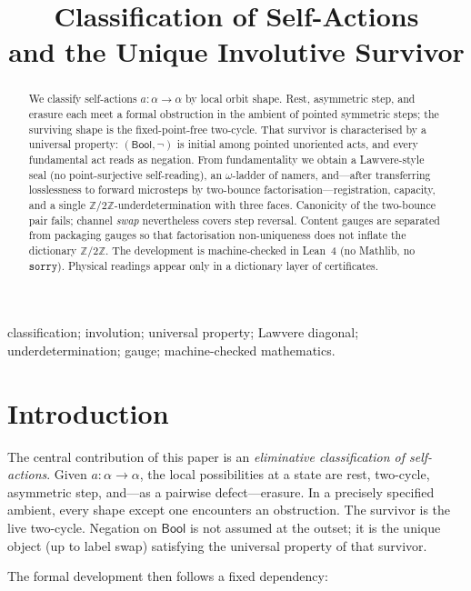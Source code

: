 \documentclass[11pt,a4paper]{article}
\title{Classification of Self-Actions\\[0.25em]
  and the Unique Involutive Survivor}
\author{} %
\date{}
\theoremstyle{plain}
\theoremstyle{definition}
\theoremstyle{remark}
\newcommand{\Bool}{\mathsf{Bool}}
\newcommand{\Ztwo}{\mathbb{Z}/2\mathbb{Z}}
\begin{document}
\maketitle

\begin{abstract}
We classify self-actions $a:\alpha\to\alpha$ by local orbit shape. Rest,
asymmetric step, and erasure each meet a formal obstruction in the ambient
of pointed symmetric steps; the surviving shape is the fixed-point-free
two-cycle. That survivor is characterised by a universal property:
$(\Bool,\neg)$ is initial among pointed unoriented acts, and every
fundamental act reads as negation. From fundamentality we obtain a
Lawvere-style seal (no point-surjective self-reading), an $\omega$-ladder
of namers, and---after transferring losslessness to forward microsteps by
two-bounce factorisation---registration, capacity, and a single
$\Ztwo$-underdetermination with three faces. Canonicity of the two-bounce
pair fails; channel \emph{swap} nevertheless covers step reversal. Content
gauges are separated from packaging gauges so that factorisation
non-uniqueness does not inflate the dictionary $\Ztwo$. The development
is machine-checked in Lean~4 (no Mathlib, no $\mathtt{sorry}$). Physical
readings appear only in a dictionary layer of certificates.
\end{abstract}

classification; involution; universal property; Lawvere diagonal;
underdetermination; gauge; machine-checked mathematics.

\section{Introduction}
\label{sec:intro}

The central contribution of this paper is an \emph{eliminative
classification of self-actions}. Given $a:\alpha\to\alpha$, the local
possibilities at a state are rest, two-cycle, asymmetric step, and---as a
pairwise defect---erasure. In a precisely specified ambient, every shape
except one encounters an obstruction. The survivor is the live two-cycle.
Negation on $\Bool$ is not assumed at the outset; it is the unique object
(up to label swap) satisfying the universal property of that survivor.

The formal development then follows a fixed dependency:
\end{document}
